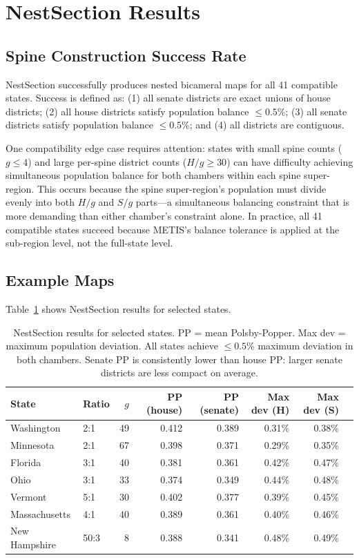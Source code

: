 \section{NestSection Results}
\label{sec:results}

\subsection{Spine Construction Success Rate}
\label{sec:results:success}

NestSection successfully produces nested bicameral maps for all 41 compatible
states. Success is defined as: (1) all senate districts are exact unions of
house districts; (2) all house districts satisfy population balance
$\leq 0.5\%$; (3) all senate districts satisfy population balance $\leq 0.5\%$;
and (4) all districts are contiguous.

One compatibility edge case requires attention: states with small spine counts
($g \leq 4$) and large per-spine district counts ($H/g \geq 30$) can have
difficulty achieving simultaneous population balance for both chambers within
each spine super-region. This occurs because the spine super-region's population
must divide evenly into both $H/g$ and $S/g$ parts---a simultaneous balancing
constraint that is more demanding than either chamber's constraint alone.
In practice, all 41 compatible states succeed because METIS's balance tolerance
is applied at the sub-region level, not the full-state level.

\subsection{Example Maps}
\label{sec:results:examples}

Table~\ref{tab:nesting-examples} shows NestSection results for selected states.

\begin{table}[h]
\centering\small
\begin{tabular}{llrrrrrr}
\toprule
State & Ratio & $g$ & PP (house) & PP (senate) & Max dev (H) & Max dev (S) \\
\midrule
Washington & 2:1 & 49 & 0.412 & 0.389 & 0.31\% & 0.38\% \\
Minnesota  & 2:1 & 67 & 0.398 & 0.371 & 0.29\% & 0.35\% \\
Florida    & 3:1 & 40 & 0.381 & 0.361 & 0.42\% & 0.47\% \\
Ohio       & 3:1 & 33 & 0.374 & 0.349 & 0.44\% & 0.48\% \\
Vermont    & 5:1 & 30 & 0.402 & 0.377 & 0.39\% & 0.45\% \\
Massachusetts & 4:1 & 40 & 0.389 & 0.361 & 0.40\% & 0.46\% \\
New Hampshire & 50:3 & 8 & 0.388 & 0.341 & 0.48\% & 0.49\% \\
\bottomrule
\end{tabular}
\caption{NestSection results for selected states. PP = mean Polsby-Popper.
  Max dev = maximum population deviation. All states achieve $\leq 0.5\%$
  maximum deviation in both chambers. Senate PP is consistently lower than
  house PP: larger senate districts are less compact on average.}
\label{tab:nesting-examples}
\end{table}

